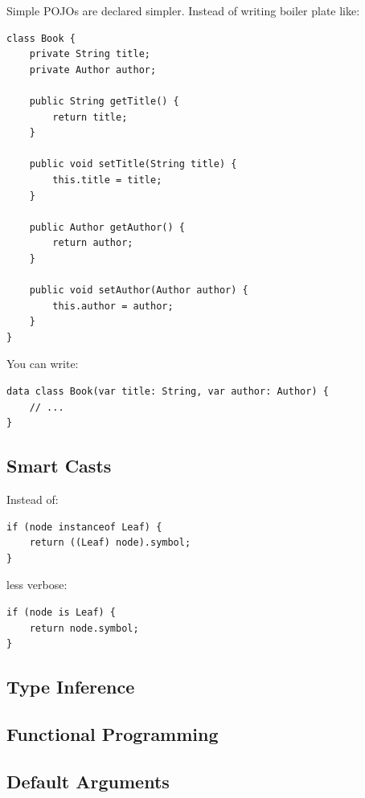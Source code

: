 \documentclass[11pt, a4paper]{report}
\begin{document}
Simple POJOs are declared simpler. Instead of writing boiler plate like:

\begin{lstlisting}
class Book {
    private String title;
    private Author author;

    public String getTitle() {
        return title;
    }
    
    public void setTitle(String title) {
        this.title = title;
    }

    public Author getAuthor() {
        return author;
    }
    
    public void setAuthor(Author author) {
        this.author = author;
    }
}
\end{lstlisting}

You can write:

\begin{lstlisting}
data class Book(var title: String, var author: Author) {
    // ...
}
\end{lstlisting}

\subsection{Smart Casts}

Instead of:

\begin{lstlisting}
if (node instanceof Leaf) {
    return ((Leaf) node).symbol;
}
\end{lstlisting}

less verbose:

\begin{lstlisting}
if (node is Leaf) {
    return node.symbol;
}
\end{lstlisting}

\subsection{Type Inference}

\subsection{Functional Programming}

\subsection{Default Arguments}
\end{document}
